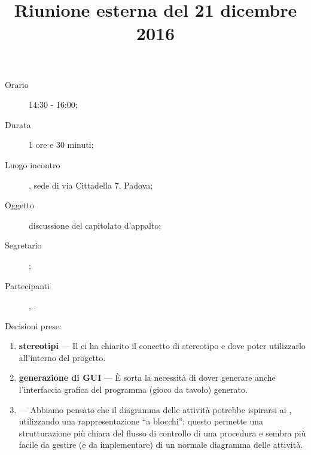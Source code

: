 


\author{\PB}
\supervisor{\MM}
\dest{\ALL}
\title{Riunione esterna del 21 dicembre 2016}



\maketitle

\begin{description}
	\item[Orario] 14:30 - 16:00;
	\item[Durata] 1 ore e 30 minuti;
	\item[Luogo incontro] \ZU, sede di via Cittadella 7, Padova;
	\item[Oggetto] discussione del capitolato d'appalto;
	\item[Segretario] \AZ; 
	\item[Partecipanti] \GP, \ALL.
\end{description}

Decisioni prese:
\begin{enumerate}
	\item \textbf{stereotipi} --- Il \GP ci ha chiarito il concetto di stereotipo e dove poter utilizzarlo all'interno del progetto.
	\item \textbf{generazione di GUI} --- È sorta la necessità di dover generare anche l'interfaccia grafica del programma (gioco da tavolo) generato.
	\item \textbf{} ---  Abbiamo pensato che il diagramma delle attività potrebbe ispirarsi ai , utilizzando una rappresentazione “a blocchi”; questo permette una strutturazione più chiara del flusso di controllo di una procedura e sembra più facile da gestire (e da implementare) di un normale diagramma delle attività.
\end{enumerate}


